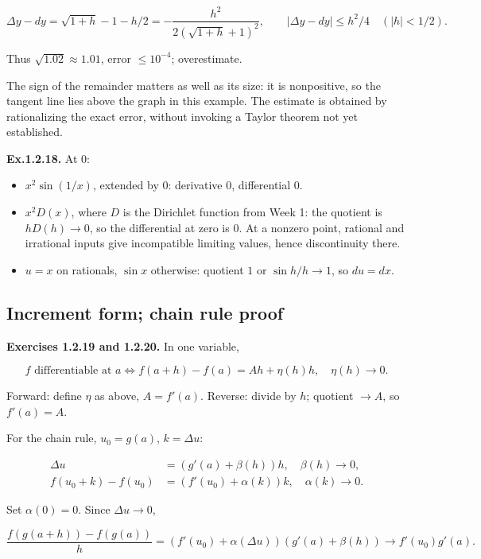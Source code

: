 \documentclass[11pt,a4paper]{article}
\begin{document}
\[
\Delta y-dy=\sqrt{1+h}-1-h/2
=-\frac{h^2}{2(\sqrt{1+h}+1)^2},\qquad
|\Delta y-dy|\le h^2/4\quad(|h|<1/2).
\]

Thus \(\sqrt{1.02}\approx1.01\), error \(\le10^{-4}\); overestimate.

The sign of the remainder matters as well as its size: it is
nonpositive, so the tangent line lies above the graph in this example.
The estimate is obtained by rationalizing the exact error, without
invoking a Taylor theorem not yet established.

\textbf{Ex.1.2.18.} At \(0\):

\begin{itemize}
\item
  \(x^2\sin(1/x)\), extended by \(0\): derivative \(0\), differential
  \(0\).
\item
  \(x^2D(x)\), where \(D\) is the Dirichlet function from Week 1: the
  quotient is \(hD(h)\to0\), so the differential at zero is \(0\). At a
  nonzero point, rational and irrational inputs give incompatible
  limiting values, hence discontinuity there.
\item
  \(u=x\) on rationals, \(\sin x\) otherwise: quotient \(1\) or
  \(\sin h/h\to1\), so \(du=dx\).
\end{itemize}

\subsection{Increment form; chain rule
proof}\label{increment-form-chain-rule-proof}

\textbf{Exercises 1.2.19 and 1.2.20.} In one variable,

\[
f\text{ differentiable at }a
\iff f(a+h)-f(a)=Ah+\eta(h)h,\quad\eta(h)\to0.
\]

Forward: define \(\eta\) as above, \(A=f'(a)\). Reverse: divide by
\(h\); quotient \(\to A\), so \(f'(a)=A\).

For the chain rule, \(u_0=g(a)\), \(k=\Delta u\):

\[
\begin{aligned}
\Delta u&=(g'(a)+\beta(h))h,\quad\beta(h)\to0,\\
f(u_0+k)-f(u_0)&=(f'(u_0)+\alpha(k))k,\quad\alpha(k)\to0.
\end{aligned}
\]

Set \(\alpha(0)=0\). Since \(\Delta u\to0\),

\[
\frac{f(g(a+h))-f(g(a))}{h}
=(f'(u_0)+\alpha(\Delta u))(g'(a)+\beta(h))\to f'(u_0)g'(a).
\]
\end{document}
